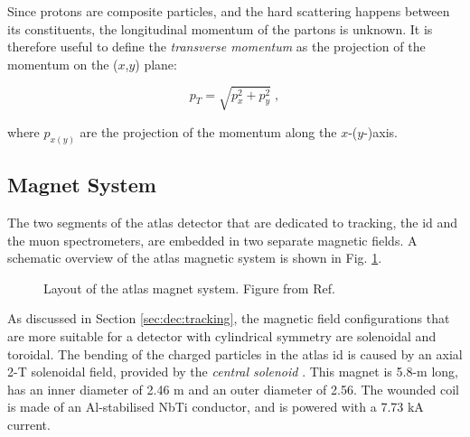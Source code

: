 Since protons are composite particles, and the hard scattering happens between its constituents, the longitudinal momentum of the partons is unknown. It is therefore useful to define the \textit{transverse momentum} as the projection of the momentum on the ($x$,$y$) plane: 

\begin{equation}
\label{eq:cern:pt}
p_T = \sqrt{p_x^2 + p_y^2} \; ,
\end{equation}

where $p_{x(y)}$ are the projection of the momentum along the $x$-($y$-)axis.




\subsection{Magnet System}
\label{sec:atlas:magnets}

The two segments of the \gls{atlas} detector that are dedicated to tracking, the \gls{id} and the muon spectrometers, are embedded in two separate magnetic fields. A schematic overview of the \gls{atlas} magnetic system is shown in Fig. \ref{fig:atlas:magnet}.
\label{sec:cern:atlasmagnets}
\begin{figure}[ht]
\centering
{}
\caption{Layout of the \gls{atlas} magnet system. Figure from Ref. \cite{Goodson}}
\label{fig:atlas:magnet}
\end{figure}

As discussed in Section \ref{sec:dec:tracking}, the magnetic field configurations that are more suitable for a detector with cylindrical symmetry are solenoidal and toroidal. The bending of the charged particles in the \gls{atlas} \gls{id} is caused by an axial 2-T solenoidal field, provided by the \textit{central solenoid} \cite{YAMAMOTO200853}. This magnet is 5.8-m long, has an inner diameter of 2.46 m and an outer diameter of 2.56. The wounded coil is made of an Al-stabilised NbTi conductor, and is powered with a 7.73 kA current. 


